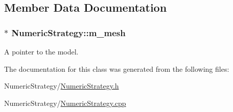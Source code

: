 \subsection{Member Data Documentation}
\hypertarget{class_numeric_strategy_a2ca52f550fd3f1cc26c65aec0cacf2f6}{
\subsubsection[{m\+\_\+mesh}]{$\ast$ Numeric\+Strategy\+::m\+\_\+mesh}}\label{class_numeric_strategy_a2ca52f550fd3f1cc26c65aec0cacf2f6}


A pointer to the model. 



The documentation for this class was generated from the following files\+:\begin{DoxyCompactItemize}
\item 
Numeric\+Strategy/\hyperlink{_numeric_strategy_8h}{Numeric\+Strategy.\+h}\item 
Numeric\+Strategy/\hyperlink{_numeric_strategy_8cpp}{Numeric\+Strategy.\+cpp}\end{DoxyCompactItemize}
